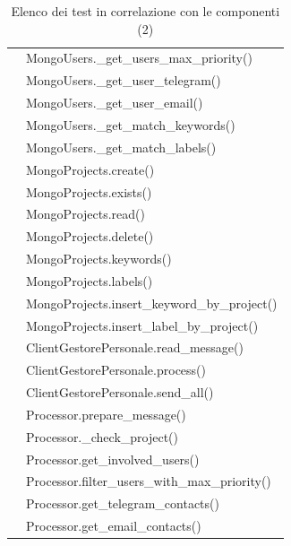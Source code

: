 		\begin{table}[H]
			\centering
			{\def\arraystretch{1.4}
            \begin{tabularx}{\textwidth}{cY}
				\addtotu & MongoUsers.\_get\_users\_max\_priority() \\
				\addtotu & MongoUsers.\_get\_user\_telegram() \\
				\addtotu & MongoUsers.\_get\_user\_email() \\
				\addtotu & MongoUsers.\_get\_match\_keywords() \\
				\addtotu & MongoUsers.\_get\_match\_labels() \\

				\addtotu & MongoProjects.create() \\
				\addtotu & MongoProjects.exists() \\
				\addtotu & MongoProjects.read() \\
				\addtotu & MongoProjects.delete() \\
				\addtotu & MongoProjects.keywords() \\
				\addtotu & MongoProjects.labels() \\
				\addtotu & MongoProjects.insert\_keyword\_by\_project() \\
				\addtotu & MongoProjects.insert\_label\_by\_project() \\

				\addtotu & ClientGestorePersonale.read\_message() \\
				\addtotu & ClientGestorePersonale.process() \\
				\addtotu & ClientGestorePersonale.send\_all() \\

				\addtotu & Processor.prepare\_message() \\
				\addtotu & Processor.\_check\_project() \\
				\addtotu & Processor.get\_involved\_users() \\
				\addtotu & Processor.filter\_users\_with\_max\_priority() \\
				\addtotu & Processor.get\_telegram\_contacts() \\
				\addtotu & Processor.get\_email\_contacts() \\
				\bottomrule
			\end{tabularx}}
			\caption{Elenco dei test in correlazione con le componenti (2)}
		\end{table}
